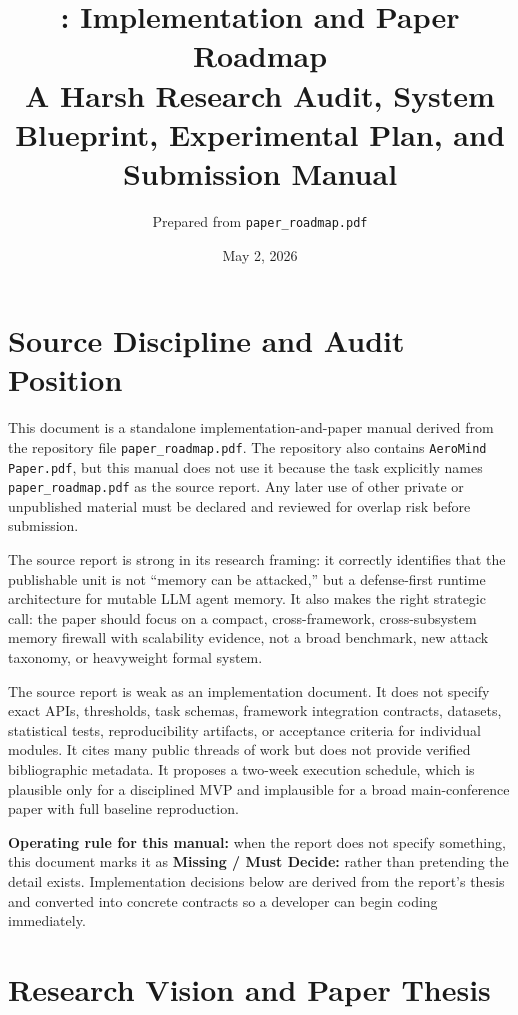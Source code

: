 \documentclass[11pt,oneside]{report}
\title{\textbf{\project: Implementation and Paper Roadmap}\\
\large A Harsh Research Audit, System Blueprint, Experimental Plan, and Submission Manual}
\author{Prepared from \texttt{paper\_roadmap.pdf}}
\date{May 2, 2026}
\newcommand{\missing}{\textbf{Missing / Must Decide: }}
\begin{document}
\maketitle
\tableofcontents

\chapter*{Source Discipline and Audit Position}

This document is a standalone implementation-and-paper manual derived from the repository file
\texttt{paper\_roadmap.pdf}. The repository also contains \texttt{AeroMind Paper.pdf}, but this
manual does not use it because the task explicitly names \texttt{paper\_roadmap.pdf} as the source
report. Any later use of other private or unpublished material must be declared and reviewed for
overlap risk before submission.

The source report is strong in its research framing: it correctly identifies that the publishable
unit is not ``memory can be attacked,'' but a defense-first runtime architecture for mutable LLM
agent memory. It also makes the right strategic call: the paper should focus on a compact,
cross-framework, cross-subsystem memory firewall with scalability evidence, not a broad benchmark,
new attack taxonomy, or heavyweight formal system.

The source report is weak as an implementation document. It does not specify exact APIs,
thresholds, task schemas, framework integration contracts, datasets, statistical tests,
reproducibility artifacts, or acceptance criteria for individual modules. It cites many public
threads of work but does not provide verified bibliographic metadata. It proposes a two-week
execution schedule, which is plausible only for a disciplined MVP and implausible for a broad
main-conference paper with full baseline reproduction.

\textbf{Operating rule for this manual:} when the report does not specify something, this document
marks it as \missing{} rather than pretending the detail exists. Implementation decisions below are
derived from the report's thesis and converted into concrete contracts so a developer can begin
coding immediately.

\chapter{Research Vision and Paper Thesis}
\end{document}
